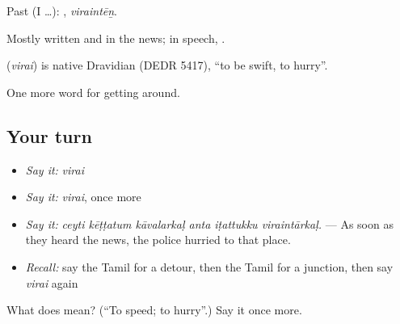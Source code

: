 Past (I …): , \emph{viraintēṉ}.

Mostly written and in the news; in speech,  .

\begin{cousinweb}
\textbf{} (\emph{virai}) is native Dravidian (DEDR 5417), \textquotedblleft{}to be swift, to hurry\textquotedblright{}.
\end{cousinweb}

\begin{grammarlens}[title={What you've built}]
One more word for getting around.
\end{grammarlens}

\subsection*{Your turn}
\begin{itemize}
\raggedright
  \item \emph{Say it:} \emph{virai}
  \item \emph{Say it:} \emph{virai}, once more
  \item \emph{Say it:} \emph{ceyti kēṭṭatum kāvalarkaḷ anta iṭattukku viraintārkaḷ.} — As soon as they heard the news, the police hurried to that place.
  \item \emph{Recall:} say the Tamil for a detour, then the Tamil for a junction, then say \emph{virai} again
\end{itemize}

\begin{tcolorbox}[breakable,colback=teal!4,colframe=teal!35!black,title={Before you move on}]
What does  mean? (\textquotedblleft{}To speed; to hurry\textquotedblright{}.) Say it once more.
\end{tcolorbox}
